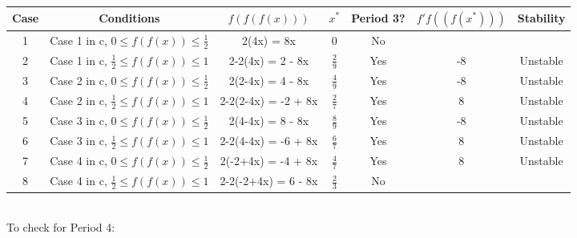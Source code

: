 \documentclass[12pt]{article}
\begin{document}
\begin{table}[h!]
  \centering
  \begin{tabular}{c|c||c|c|c|c|c}
    Case &Conditions & $f(f(f(x)))$ & $x^*$ & Period 3? & $f'f((f(x^*)))$ & Stability\\
    \hline
    1&Case 1 in c, $0\leq f(f(x)) \leq \frac{1}{2}$  & 2(4x) = 8x & 0 & No & & \\
    2&Case 1 in c, $\frac{1}{2} \leq f(f(x)) \leq 1$  & 2-2(4x) = 2 - 8x & $\frac{2}{9}$ & Yes &-8 & Unstable\\
    3&Case 2 in c, $0\leq f(f(x)) \leq \frac{1}{2}$  & 2(2-4x) = 4 - 8x & $\frac{4}{9}$ & Yes &-8 & Unstable \\
    4&Case 2 in c, $\frac{1}{2} \leq f(f(x)) \leq 1$  & 2-2(2-4x) = -2 + 8x & $\frac{2}{7}$& Yes &8 & Unstable \\
    5&Case 3 in c, $0\leq f(f(x)) \leq \frac{1}{2}$  & 2(4-4x) = 8 - 8x & $\frac{8}{9}$ & Yes &-8 & Unstable \\
    6&Case 3 in c, $\frac{1}{2} \leq f(f(x)) \leq 1$  & 2-2(4-4x) = -6 + 8x & $\frac{6}{7}$ & Yes &8 & Unstable \\
    7&Case 4 in c, $0\leq f(f(x)) \leq \frac{1}{2}$  & 2(-2+4x) = -4 + 8x & $\frac{4}{7}$ & Yes &8 & Unstable \\
    8&Case 4 in c, $\frac{1}{2} \leq f(f(x)) \leq 1$  & 2-2(-2+4x) = 6 - 8x & $\frac{2}{3}$ & No & & \\
  \end{tabular}
\end{table}\\
To check for Period 4:
\end{document}
